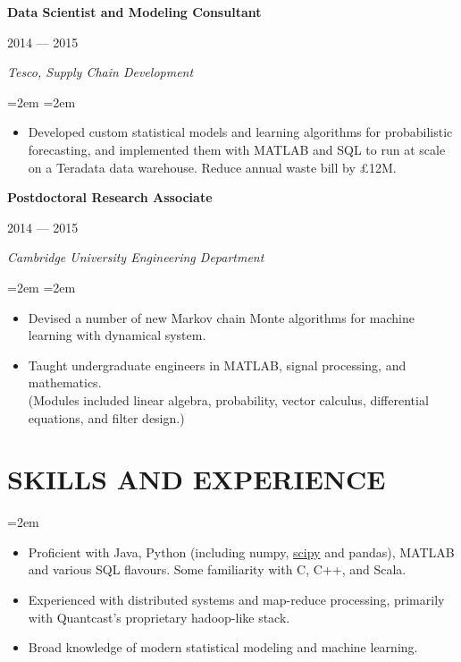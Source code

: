 \documentclass[letterpaper,10pt]{article}
\newcommand{\sepspace}{\vspace*{0.3em}}
\newcommand{\NewPart}[1]{\vspace{-1em} \section*{\uppercase{#1}}}
\newcommand{\MainHeading}[1]{\noindent\textbf{#1}}
\newcommand{\SubHeading}[1]{\noindent\textit{#1}}
\newcommand{\DateBox}[1]{\colorbox{light-gray}{\parbox{8em}{\hfill\color{White}#1}}}
\newcommand{\Details}[1]{\hangindent=2em\hangafter=0\small#1\normalsize\par}
\newcommand{\WorkEntry}[4]{%
                \MainHeading{#1} \hfill \DateBox{#2} \par
                \SubHeading{#3} \par
                \noindent \hangindent=2em \hangafter=0 \Details{#4} }
\begin{document}
\WorkEntry{Data Scientist and Modeling Consultant}{2014 --- 2015}{Tesco, Supply Chain Development}{
\begin{itemize}
 \item Developed custom statistical models and learning algorithms for probabilistic forecasting, and implemented them with MATLAB and SQL to run at scale on a Teradata data warehouse. Reduce annual waste bill by \pounds 12M.
\end{itemize}
}
\sepspace

\WorkEntry{Postdoctoral Research Associate}{2014 --- 2015}{Cambridge University Engineering Department}{
\begin{itemize}
 \item Devised a number of new Markov chain Monte algorithms for machine learning with dynamical system.
 \item Taught undergraduate engineers in MATLAB, signal processing, and mathematics. \\ (Modules included linear algebra, probability, vector calculus, differential equations, and filter design.)
\end{itemize}
}
\sepspace





\NewPart{Skills and Experience}
\Details{
\begin{itemize}
 \item Proficient with Java, Python (including numpy, \href{https://github.com/scipy/scipy/pull/5296}{scipy} and pandas), MATLAB and various SQL flavours. Some familiarity with C, C++, and Scala.
 \item Experienced with distributed systems and map-reduce processing, primarily with Quantcast's proprietary hadoop-like stack.
 \item Broad knowledge of modern statistical modeling and machine learning.
\end{itemize}
}
\end{document}
